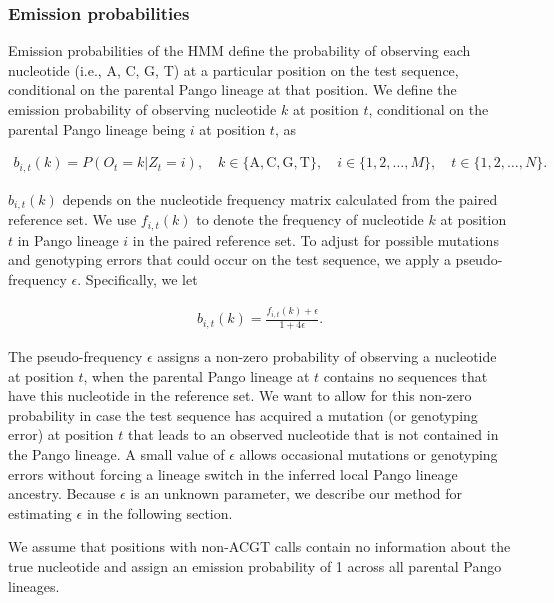 \documentclass[11pt,oneside,letterpaper]{article}
\begin{document}
\subsubsection{Emission probabilities}

Emission probabilities of the HMM define the probability of observing each nucleotide (i.e., A, C, G, T) at a particular position on the test sequence, conditional on the parental Pango lineage at that position. We define the emission probability of observing nucleotide $k$ at position $t$, conditional on the parental Pango lineage being $i$ at position $t$, as

\begin{align*}
    b_{i,t}(k) = P(O_t = k|Z_t = i), \quad k \in \{\text{A}, \text{C}, \text{G}, \text{T}\}, \quad i \in \{1, 2, \dots, M\}, \quad t \in \{1, 2, \dots, N\}.
\end{align*}

$b_{i,t}(k)$ depends on the nucleotide frequency matrix calculated from the paired reference set. We use $f_{i,t}(k)$ to denote the frequency of nucleotide $k$ at position $t$ in Pango lineage $i$ in the paired reference set. To adjust for possible mutations and genotyping errors that could occur on the test sequence, we apply a pseudo-frequency $\epsilon$. Specifically, we let

\begin{align*}
b_{i,t}(k) = \frac{f_{i,t}(k) + \epsilon}{1 + 4\epsilon}.
\end{align*}

The pseudo-frequency $\epsilon$ assigns a non-zero probability of observing a nucleotide at position $t$, when the parental Pango lineage at $t$ contains no sequences that have this nucleotide in the reference set. We want to allow for this non-zero probability in case the test sequence has acquired a mutation (or genotyping error) at position $t$ that leads to an observed nucleotide that is not contained in the Pango lineage. A small value of $\epsilon$ allows occasional mutations or genotyping errors without forcing a lineage switch in the inferred local Pango lineage ancestry. Because $\epsilon$ is an unknown parameter, we describe our method for estimating $\epsilon$ in the following section.

We assume that positions with non-ACGT calls contain no information about the true nucleotide and assign an emission probability of 1 across all parental Pango lineages.
\end{document}
